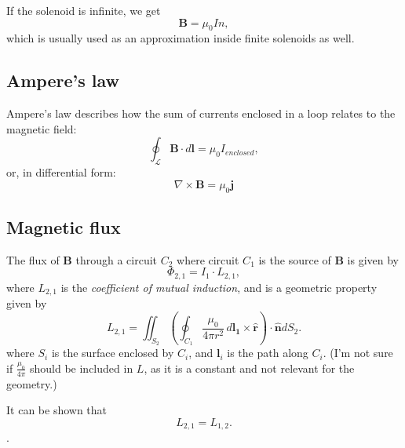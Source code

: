 \documentclass[a4paper, 12pt]{article}
\renewcommand{\vec}[1]{\mathbf{#1}}
\renewcommand{\j}{\ensuremath{\vec{j}}}
\newcommand{\B}{\ensuremath{\vec{B}}}
\let\tmp\hat
\renewcommand{\hat}[1]{\vec{\tmp{#1}}}
\begin{document}
            If the solenoid is infinite, we get
            \begin{equation}
                \B = \mu_0 In,
            \end{equation}
            which is usually used as an approximation inside finite solenoids as well.
    
    \subsection{Ampere's law}
        Ampere's law describes how the sum of currents enclosed in a loop relates to the magnetic field: 
        \begin{equation}
            \oint_\mathcal{L}\B\cdot d\vec{l} = \mu_0 I_{enclosed},
        \end{equation}
        or, in differential form: 
        \begin{equation}
            \nabla\times\B = \mu_0\j
        \end{equation}
    
    \subsection{Magnetic flux} \label{Magnetic flux}
        The flux of \B{} through a circuit $C_2$ where circuit $C_1$ is the source of \B{} is given by
        \begin{equation}
            \Phi_{2,1} = I_1 \cdot L_{2,1},
        \end{equation}
        where $L_{2,1}$ is the \textit{coefficient of mutual induction}, and is a geometric property given by
        \begin{equation}
            L_{2,1} = \iint_{S_2} \left(\oint_{C_1}\frac{\mu_0}{4\pi r^2}\,d\vec{l_1}\times \hat{r} \right)\cdot \hat{n} dS_2.
        \end{equation}
        where $S_i$ is the surface enclosed by $C_i$, and $\vec{l}_i$ is the path along $C_i$.
        (I'm not sure if $\frac{\mu_0}{4\pi}$ should be included in $L$, as it is a constant and not relevant for the geometry.)

        It can be shown that 
        \begin{equation}
            L_{2,1} = L_{1,2}.
        \end{equation}.
    
\end{document}
